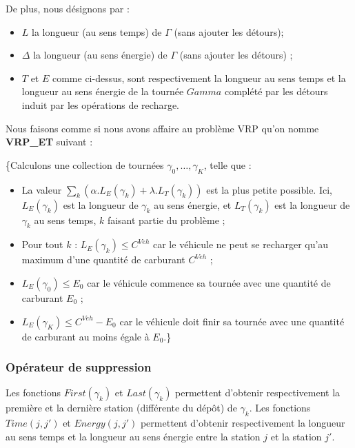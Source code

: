 {\begin{itemize}[label=$\square$]
	\end{itemize}
	
	De plus, nous désignons par :
	
	\begin{itemize}[label=$\square$]
		\item $L$ la longueur (au sens temps) de $\Gamma$ (sans ajouter les détours);
		\item $\Delta$ la longueur (au sens énergie) de $\Gamma$ (sans ajouter les détours) ;
		\item $T$ et $E$ comme ci-dessus, sont respectivement la longueur au sens temps et la longueur au sens énergie de la tournée $Gamma$ complété par les détours induit par les opérations de recharge. 
	\end{itemize}
	
	Nous faisons comme si nous avons affaire au problème VRP qu'on nomme \textbf{VRP\_ET} suivant :
	
	\{Calculons une collection de tournées $\gamma_0, \dots, \gamma_K$, telle que :
	\begin{itemize}[label=$\square$]
		\item La valeur $\sum_k (\alpha.L_E(\gamma_k) + \lambda.L_T(\gamma_k))$ est la plus petite possible. Ici, $L_E(\gamma_k)$ est la longueur de $\gamma_k$ au sens énergie, et $L_T(\gamma_k)$ est la longueur de $\gamma_k$ au sens temps, $k$ faisant partie du problème ; 
		\item Pour tout $k$ : $L_E(\gamma_k) \leq C^{Veh}$ car le véhicule ne peut se recharger qu'au maximum  d'une quantité de carburant $C^{Veh}$ ;
		\item $L_E(\gamma_0) \leq E_0$ car le véhicule commence sa tournée avec une quantité de carburant $E_0$ ; 
		\item $L_E(\gamma_K) \leq C^{Veh} -E_0$ car le véhicule doit finir sa tournée avec une quantité de carburant au moins égale à $E_0$.\}
		
	\end{itemize}
	\subsubsection{Opérateur de suppression}
	Les fonctions $First(\gamma_k)$ et $Last(\gamma_k)$ permettent d'obtenir respectivement la première et la dernière station (différente du dépôt) de $\gamma_k$. Les fonctions $Time(j,j')$ et $Energy(j,j')$ permettent d'obtenir respectivement la longueur au sens temps et la longueur au sens énergie entre la station $j$ et la station $j'$.
	
}
